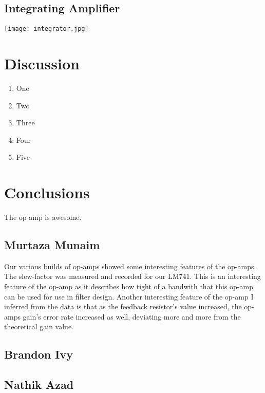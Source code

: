 \documentclass{article}
\begin{document}
\subsection{Integrating Amplifier}

\begin{center}
\texttt{[image: integrator.jpg]}
\label{integamp}
\end{center}
\vspace{10pt}


\section{Discussion}
\begin{enumerate}
\item One
\item Two
\item Three
\item Four
\item Five
\end{enumerate}

\section{Conclusions}
The op-amp is awesome.
\subsection{Murtaza Munaim}
Our various builds of op-amps showed some interesting features of the op-amps. The slew-factor was measured and recorded for
our LM741. This is an interesting feature of the op-amp as it describes how tight of a bandwith that this op-amp can be used 
for use in filter design. Another interesting feature of the op-amp I inferred from the data is that as the feedback resistor's
value increased, the op-amps gain's error rate increased as well, deviating more and more from the theoretical gain value.
\subsection{Brandon Ivy}
\subsection{Nathik Azad}

%
%
\end{document}
